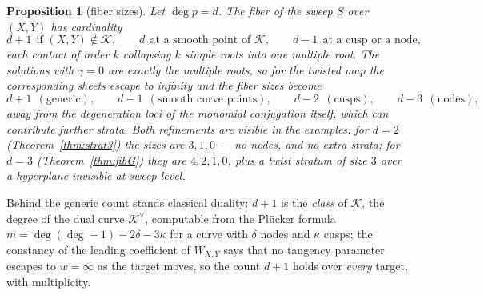 \documentclass[11pt]{article}
\theoremstyle{plain}
\newtheorem{proposition}[theorem]{Proposition}
\theoremstyle{definition}
\theoremstyle{remark}
\begin{document}
\begin{proposition}[fiber sizes]\label{prop:fibsizes}
Let $\deg p=d$. The fiber of the sweep $S$ over $(X,Y)$ has cardinality
\[
d+1\ \ \text{if }(X,Y)\notin\mathcal K,\qquad
d\ \ \text{at a smooth point of }\mathcal K,\qquad
d-1\ \ \text{at a cusp or a node},
\]
each contact of order $k$ collapsing $k$ simple roots into one multiple root.
The solutions with $\gamma=0$ are exactly the multiple roots, so for the
twisted map the corresponding sheets escape to infinity and the fiber sizes
become
\[
d+1\ \ (\text{generic}),\qquad
d-1\ \ (\text{smooth curve points}),\qquad
d-2\ \ (\text{cusps}),\qquad
d-3\ \ (\text{nodes}),
\]
away from the degeneration loci of the monomial conjugation itself, which can
contribute further strata. Both refinements are visible in the examples: for
$d=2$ (Theorem~\ref{thm:strat3}) the sizes are $3,1,0$ --- no nodes, and no
extra strata; for $d=3$ (Theorem~\ref{thm:fibG}) they are $4,2,1,0$,
\emph{plus} a twist stratum of size $3$ over a hyperplane invisible at sweep
level.
\end{proposition}

Behind the generic count stands classical duality: $d+1$ is the \emph{class}
of $\mathcal{K}$, the degree of the dual curve $\mathcal{K}^\vee$, computable
from the Pl\"ucker formula $m=\deg(\deg-1)-2\delta-3\kappa$ for a curve with
$\delta$ nodes and $\kappa$ cusps; the constancy of the leading coefficient of
$W_{X,Y}$ says that no tangency parameter escapes to $w=\infty$ as the target
moves, so the count $d+1$ holds over \emph{every} target, with multiplicity.
\end{document}
